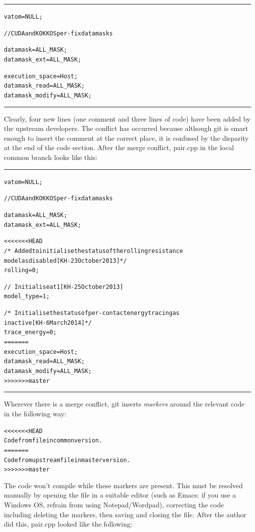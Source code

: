 \documentclass[a4paper,oneside,11pt]{article}
\begin{document}
\noindent\textcolor{customblue}{\rule{8cm}{0.8pt}}
\begin{alltt}
  vatom = NULL;

  // CUDA and KOKKOS per-fix data masks

  datamask = ALL_MASK;
  datamask_ext = ALL_MASK;

  execution_space = Host;
  datamask_read = ALL_MASK;
  datamask_modify = ALL_MASK;
\end{alltt}
\noindent\textcolor{customblue}{\rule{8cm}{0.8pt}}

Clearly, four new lines (one comment and three lines of code) have been added by the upstream developers. The conflict has occurred because although git is smart enough to insert the comment at the correct place, it is confused by the disparity at the end of the code section. After the merge conflict, pair.cpp in the local common branch looks like this:

\noindent\textcolor{customblue}{\rule{8cm}{0.8pt}}
\begin{alltt}
  vatom = NULL;

  // CUDA and KOKKOS per-fix data masks

  datamask = ALL_MASK;
  datamask_ext = ALL_MASK;

<<<<<<< HEAD
  /*~ Added to initialise the status of the rolling resistance
    model as disabled [KH - 23 October 2013]*/
  rolling = 0;

  //~ Initialise at 1 [KH - 25 October 2013]
  model_type = 1;

  /*~ Initialise the status of per-contact energy tracing as
    inactive [KH - 6 March 2014]*/
  trace_energy = 0;
=======
  execution_space = Host;
  datamask_read = ALL_MASK;
  datamask_modify = ALL_MASK;
>>>>>>> master
\end{alltt}
\noindent\textcolor{customblue}{\rule{8cm}{0.8pt}}

Wherever there is a merge conflict, git inserts \emph{markers} around the relevant code in the following way:
\begin{alltt}
<<<<<<< HEAD
  Code from file in common version.
=======
  Code from upstream file in master version.
>>>>>>> master
\end{alltt}
The code won't compile while these markers are present. This must be resolved manually by opening the file in a suitable editor (such as Emacs; if you use a Windows OS, refrain from using Notepad\slash Wordpad), correcting the code including deleting the markers, then saving and closing the file. After the author did this, pair.cpp looked like the following:
\end{document}
